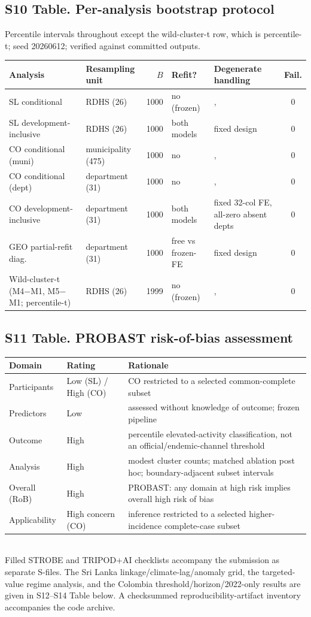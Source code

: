 \documentclass[11pt,a4paper]{article}
\begin{document}
\subsection*{S10 Table. Per-analysis bootstrap protocol}
\noindent Percentile intervals throughout except the wild-cluster-t row, which is percentile-t; seed 20260612; verified against committed outputs.\\[0.3em]
\begin{tabularx}{\textwidth}{@{}XlrlXc@{}}
\toprule
Analysis & Resampling unit & $B$ & Refit? & Degenerate handling & Fail. \\
\midrule
SL conditional & RDHS (26) & 1000 & no (frozen) &, & 0 \\
SL development-inclusive & RDHS (26) & 1000 & both models & fixed design & 0 \\
CO conditional (muni) & municipality (475) & 1000 & no &, & 0 \\
CO conditional (dept) & department (31) & 1000 & no &, & 0 \\
CO development-inclusive & department (31) & 1000 & both models & fixed 32-col FE, all-zero absent depts & 0 \\
GEO partial-refit diag.\ & department (31) & 1000 & free vs frozen-FE & fixed design & 0 \\
Wild-cluster-t (M4$-$M1, M5$-$M1; percentile-t) & RDHS (26) & 1999 & no (frozen) &, & 0 \\
\bottomrule
\end{tabularx}

\subsection*{S11 Table. PROBAST risk-of-bias assessment}
\begin{tabularx}{\textwidth}{@{}llX@{}}
\toprule
Domain & Rating & Rationale \\
\midrule
Participants & Low (SL) / High (CO) & CO restricted to a selected common-complete subset \\
Predictors & Low & assessed without knowledge of outcome; frozen pipeline \\
Outcome & High & percentile elevated-activity classification, not an official/endemic-channel threshold \\
Analysis & High & modest cluster counts; matched ablation post hoc; boundary-adjacent subset intervals \\
\midrule
Overall (RoB) & High & PROBAST: any domain at high risk implies overall high risk of bias \\
Applicability & High concern (CO) & inference restricted to a selected higher-incidence complete-case subset \\
\bottomrule
\end{tabularx}\\[0.2em]
\noindent Filled STROBE and TRIPOD+AI checklists accompany the submission as
separate S-files. The Sri Lanka linkage/climate-lag/anomaly grid, the targeted-value
regime analysis, and the Colombia threshold/horizon/2022-only results are given in
S12--S14 Table below. A checksummed reproducibility-artifact inventory accompanies the
code archive.
\end{document}
